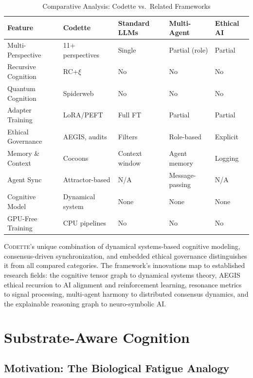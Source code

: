 \documentclass[11pt,a4paper]{article}
\newcommand{\rcxi}{RC+$\xi$}
\newcommand{\codette}{\textsc{Codette}}
\begin{document}
\begin{table}[H]
\centering
\caption{Comparative Analysis: Codette vs.\ Related Frameworks}
\label{tab:comparative}
\begin{tabular}{@{}lp{2.2cm}p{2cm}p{2cm}p{2cm}@{}}
\toprule
\textbf{Feature} & \textbf{Codette} & \textbf{Standard LLMs} & \textbf{Multi-Agent} & \textbf{Ethical AI} \\
\midrule
Multi-Perspective   & 11+ perspectives & Single        & Partial (role) & Partial \\
Recursive Cognition & \rcxi{}          & No            & No             & No \\
Quantum Cognition   & Spiderweb        & No            & No             & No \\
Adapter Training    & LoRA/PEFT        & Full FT       & Partial        & Partial \\
Ethical Governance   & AEGIS, audits   & Filters       & Role-based     & Explicit \\
Memory \& Context   & Cocoons          & Context window & Agent memory  & Logging \\
Agent Sync          & Attractor-based  & N/A           & Message-passing & N/A \\
Cognitive Model     & Dynamical system & None          & None           & None \\
GPU-Free Training   & CPU pipelines    & No            & No             & No \\
\bottomrule
\end{tabular}
\end{table}

\codette{}'s unique combination of dynamical systems-based cognitive modeling, consensus-driven synchronization, and embedded ethical governance distinguishes it from all compared categories. The framework's innovations map to established research fields: the cognitive tensor graph to dynamical systems theory, AEGIS ethical recursion to AI alignment and reinforcement learning, resonance metrics to signal processing, multi-agent harmony to distributed consensus dynamics, and the explainable reasoning graph to neuro-symbolic AI.

\section{Substrate-Aware Cognition}
\label{sec:substrate}

\subsection{Motivation: The Biological Fatigue Analogy}
\end{document}
